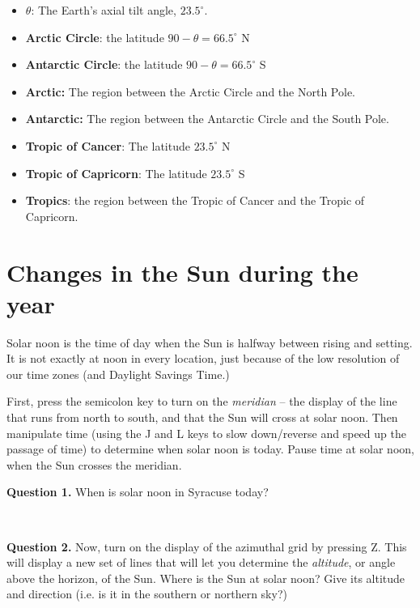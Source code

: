 \documentclass[11pt]{article}
\begin{document}
\begin{itemize}
\item {\bf $\theta$}: The Earth's axial tilt angle, $23.5^\circ$.
\item {\bf Arctic Circle}: the latitude $90-\theta = 66.5^\circ$ N
\item {\bf Antarctic Circle}: the latitude $90-\theta = 66.5^\circ$ S
\item {\bf Arctic:} The region between the Arctic Circle and the North Pole.
\item {\bf Antarctic:} The region between the Antarctic Circle and the South Pole.
\item {\bf Tropic of Cancer}: The latitude $23.5^\circ$ N
\item {\bf Tropic of Capricorn}: The latitude $23.5^\circ$ S
\item {\bf Tropics}: the region between the Tropic of Cancer and the Tropic of Capricorn.
\end{itemize}


\newpage

\section{Changes in the Sun during the year}

Solar noon is the time of day when the Sun is halfway between rising and setting. It is not exactly at noon in every location,
just because of the low resolution of our time zones (and Daylight Savings Time.) 

First, press the semicolon key to turn on the {\it meridian} -- the display of the line that runs from north to south, and 
that the Sun will cross at solar noon. Then manipulate time (using the J and L keys to slow down/reverse and speed up the passage
of time) to determine when solar noon is today. Pause time at solar noon, when the Sun crosses the meridian.

\textbf{Question 1.} When is solar noon in Syracuse today? 
\vspace*{1.5cm}

\hrulefill\\
\noindent

\noindent \textbf{Question 2.} 
Now, turn on the display of the azimuthal grid by pressing Z. This will display a new set of lines that will let you 
determine the {\it altitude}, or angle above the horizon, of the Sun. Where is the Sun at solar noon? Give its altitude and 
direction (i.e. is it in the southern or northern sky?)
\end{document}
